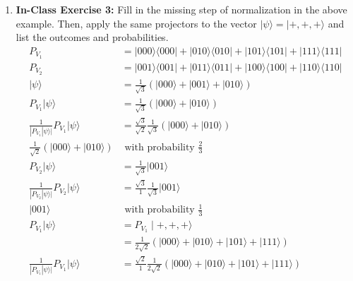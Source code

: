 \documentclass[main.tex]{subfiles}
\begin{document}
\begin{enumerate}
\item[] \textbf{In-Class Exercise 3:} Fill in the missing step of normalization in the above example. Then, apply the same projectors to the vector $|\psi\rangle=|+,+,+\rangle$ and list the outcomes and probabilities.
    \begin{align*}
        P_{V_{1}}                           & = |000\rangle\langle 000|
                                            +|010\rangle\langle 010|
                                            +|101\rangle\langle 101|
                                            +|111\rangle\langle 111| \\
        P_{V_{2}}                           & = |001\rangle\langle 001|
                                            +|011\rangle\langle 011|
                                            +|100\rangle\langle 100|
                                            +|110\rangle\langle 110| \\
        |\psi\rangle                        & = \frac{1}{\sqrt{3}}(|000\rangle+|001\rangle+|010\rangle)\\
        P_{V_{1}}|\psi\rangle               & = \frac{1}{\sqrt{3}}(|000\rangle+|010\rangle) \\
        \frac{1}{|P_{V_{1}}|\psi\rangle|}
        P_{V_{1}}|\psi\rangle               & = \frac{\sqrt{3}}{\sqrt{2}}\frac{1}{\sqrt{3}}(|000\rangle+|010\rangle)\\
        \frac{1}{\sqrt{2}}
        (|000\rangle+|010\rangle)           & \text{ with probability } \frac{2}{3}\\
        P_{V_{2}}|\psi\rangle               & = \frac{1}{\sqrt{3}}|001\rangle\\
        \frac{1}{|P_{V_{2}}|\psi\rangle|}
        P_{V_{2}}|\psi\rangle               & = \frac{\sqrt{3}}{1}\frac{1}{\sqrt{3}}|001\rangle\\
        |001\rangle                         & \text{ with probability } \frac{1}{3}\\
        P_{V_{1}}|\psi\rangle               & = P_{V_{1}}\mid+,+,+\rangle\\
                                            & = \frac{1}{2\sqrt{2}}\left(|000\rangle+|010\rangle
                                            +|101\rangle+|111\rangle\right)\\
        \frac{1}{|P_{V_{1}}|\psi\rangle|}
        P_{V_{1}}|\psi\rangle               & = \frac{\sqrt{2}}{1}\frac{1}{2\sqrt{2}}\left(|000\rangle+|010\rangle
                                            +|101\rangle+|111\rangle\right)\\

\end{align*}
\end{enumerate}
\end{document}
